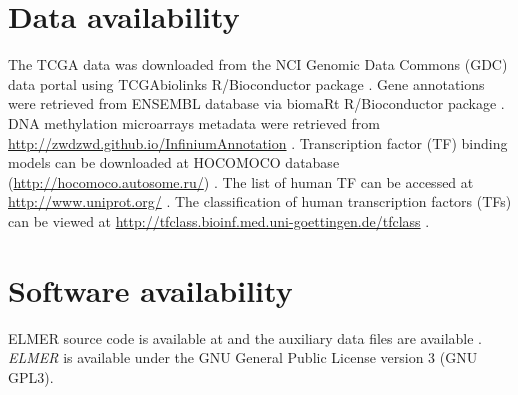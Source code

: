 \section*{Data availability} %
The TCGA data was downloaded from the NCI Genomic Data Commons (GDC) data portal \cite{grossman2016toward}
using TCGAbiolinks R/Bioconductor package \cite{colaprico2015tcgabiolinks,10.12688/f1000research.8923.2}.
Gene annotations were retrieved from ENSEMBL \cite{yates2015ensembl} database via biomaRt R/Bioconductor
package \cite{durinck2005biomart,durinck2009mapping}.
DNA methylation microarrays metadata were retrieved from \url{http://zwdzwd.github.io/InfiniumAnnotation} \cite{doi:10.1093/nar/gkw967}.
Transcription factor (TF) binding models can be downloaded at HOCOMOCO database (\url{http://hocomoco.autosome.ru/}) \cite{kulakovskiy2016hocomoco}.
The list of human TF can be accessed at \url{http://www.uniprot.org/}  \cite{apweiler2004uniprot}.
The classification of human transcription factors (TFs) can be viewed at \url{http://tfclass.bioinf.med.uni-goettingen.de/tfclass}  \cite{wingender2013tfclass}.

\section*{Software availability}

ELMER	source code  is available at 
and the auxiliary data files are available .
\textit{ELMER} is available under the GNU General Public License version 3 (GNU GPL3).

